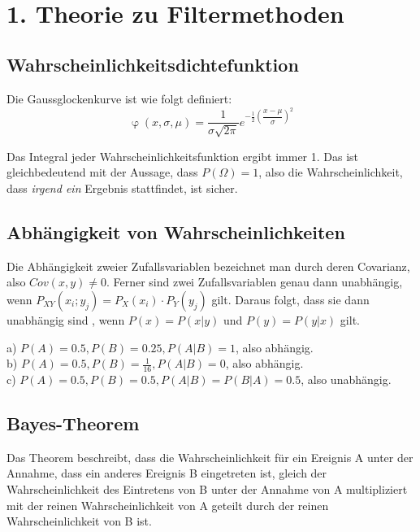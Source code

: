 \documentclass{../Vorlage/mat}
\begin{document}
 \\

\section*{1. Theorie zu Filtermethoden}
\subsection*{Wahrscheinlichkeitsdichtefunktion}
Die Gaussglockenkurve ist wie folgt definiert:
\begin{equation}
	\upvarphi(x, \sigma, \mu) = \dfrac{1}{\sigma\sqrt{2\pi}}e^{-\frac{1}{2}\left(\dfrac{x-\mu}{\sigma}\right)^2}
\end{equation}

Das Integral jeder Wahrscheinlichkeitsfunktion ergibt immer 1. Das ist gleichbedeutend mit der Aussage, dass $P(\Omega) = 1$, also die Wahrscheinlichkeit, dass \textit{irgend ein} Ergebnis stattfindet, ist sicher.

\subsection*{Abhängigkeit von Wahrscheinlichkeiten}

Die Abhängigkeit zweier Zufallsvariablen bezeichnet man durch deren Covarianz, also $Cov(x,y) \neq 0$. Ferner sind zwei Zufallsvariablen genau dann unabhängig, wenn $P_{XY}(x_i;y_j) = P_X(x_i)\cdot P_Y(y_j)$ gilt. Daraus folgt, dass sie dann unabhängig sind , wenn $P(x) = P(x | y)$ und $P(y) = P(y | x)$ gilt.

a) 
$P(A) = 0.5 , P(B) = 0.25, P(A|B) = 1$, also abhängig.\\
b)
$P(A) = 0.5, P(B) = \frac{1}{16}, P(A|B) = 0$, also abhängig.\\
c)
$P(A) = 0.5, P(B) = 0.5, P(A|B) = P(B|A) = 0.5$, also unabhängig.


\subsection*{Bayes-Theorem}
Das Theorem beschreibt, dass die Wahrscheinlichkeit für ein Ereignis A unter der Annahme, dass ein anderes Ereignis B eingetreten ist, gleich der Wahrscheinlichkeit des Eintretens von B unter der Annahme von A multipliziert mit der reinen Wahrscheinlichkeit von A geteilt durch der reinen Wahrscheinlichkeit von B ist.
\end{document}
